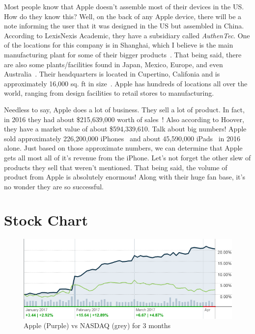 \documentclass[12pt,a4paper,titlepage]{article}
\begin{document}
Most people know that Apple doesn't assemble most of their devices in the
US. How do they know this? Well, on the back of any Apple device, there will be
a note informing the user that it was designed in the US but assembled in
China. According to LexisNexis Academic, they have a subsidiary called
\emph{AuthenTec}. One of the locations for this company is in Shanghai, which I
believe is the main manufacturing plant for some of their bigger
products~\cite{lexis}. That being said, there are also some plants/facilities
found in Japan, Mexico, Europe, and even Australia~\cite{lexis}. Their
headquarters is located in Cupertino, Califonia and is approximately 16,000
sq. ft in size~\cite{hoover}. Apple has hundreds of locations all over the
world, ranging from design facilities to retail stores to manufacturing.

Needless to say, Apple does a lot of business. They sell a lot of product. In
fact, in 2016 they had about \$215,639,000 worth of sales~\cite{hoover}!  Also
according to Hoover, they have a market value of about \$594,339,610. Talk about
big numbers! Apple sold approximately 226,200,000 iPhones~\cite{lifewire} and
about 45,590,000 iPads~\cite{lifewire2} in 2016 alone. Just based on those
approximate numbers, we can determine that Apple gets all most all of it's
revenue from the iPhone. Let's not forget the other slew of products they sell
that weren't mentioned. That being said, the volume of product from Apple is
absolutely enormous! Along with their huge fan base, it's no wonder they are so
successful.

\newpage

\section{Stock Chart}

\begin{figure}[!htb]
  \centering
  \includegraphics[width=1\textwidth]{apple-chart-3mo}
    \caption{Apple (Purple) vs NASDAQ (grey) for 3 months~\cite{cnnapple}}
\end{figure}
\end{document}

